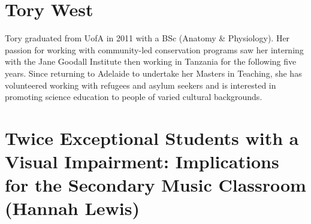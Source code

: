 \documentclass[twoside,14pt,a4paper,notitlepage]{memoir}
\begin{document}
\section*{Tory West}

Tory graduated from UofA in 2011 with a BSc (Anatomy \& Physiology). Her passion for working with community-led conservation programs saw her interning with the Jane Goodall Institute then working in Tanzania for the following five years. Since returning to Adelaide to undertake her Masters in Teaching, she has volunteered working with refugees and asylum seekers and is interested in promoting science education to people of varied cultural backgrounds.



\section*{Twice Exceptional Students with a Visual Impairment: Implications for the Secondary Music Classroom (Hannah Lewis)}
\label{aut:lewis}
\end{document}
